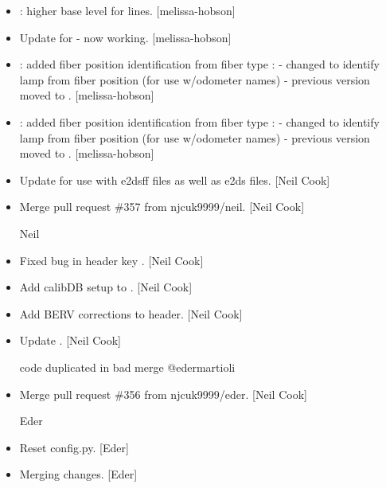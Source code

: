 \documentclass[a4paper,10pt,english]{report}
\begin{document}
\begin{itemize}
\item {} 
: higher base level for lines. {[}melissa-hobson{]}

\item {} 
Update for  - now working. {[}melissa-hobson{]}

\item {} 
: added fiber position identification from fiber
type : - changed to identify lamp from
fiber position (for use w/odometer names) - previous version moved to
. {[}melissa-hobson{]}

\item {} 
: added fiber position identification from fiber
type : - changed to identify lamp from
fiber position (for use w/odometer names) - previous version moved to
. {[}melissa-hobson{]}

\item {} 
Update for use with e2dsff files as well as e2ds files. {[}Neil Cook{]}

\item {} 
Merge pull request \#357 from njcuk9999/neil. {[}Neil Cook{]}

Neil

\item {} 
Fixed bug in header key . {[}Neil Cook{]}

\item {} 
Add calibDB setup to . {[}Neil Cook{]}

\item {} 
Add BERV corrections to header. {[}Neil Cook{]}

\item {} 
Update . {[}Neil Cook{]}

code duplicated in bad merge @edermartioli

\item {} 
Merge pull request \#356 from njcuk9999/eder. {[}Neil Cook{]}

Eder

\item {} 
Reset config.py. {[}Eder{]}

\item {} 
Merging changes. {[}Eder{]}


\end{itemize}
\end{document}
